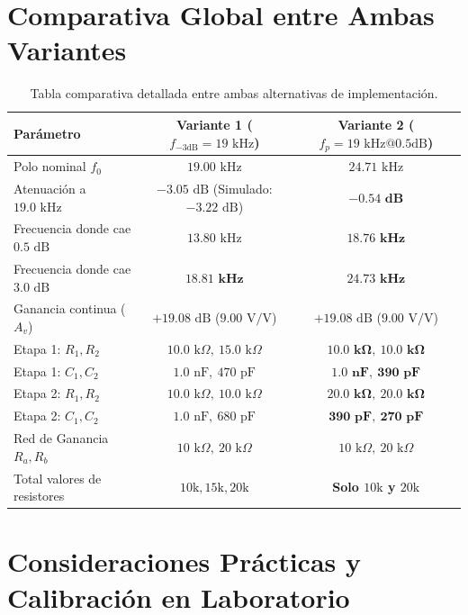 \documentclass[a4paper,11pt]{article}
\begin{document}
\section{Comparativa Global entre Ambas Variantes}

\begin{table}[H]
\centering
\small
\setlength{\tabcolsep}{5pt}
\begin{tabular}{lcc}
\toprule
\textbf{Parámetro} & \textbf{Variante 1 ($f_{-3\text{dB}} = 19\text{ kHz}$)} & \textbf{Variante 2 ($f_p = 19\text{ kHz} @ 0.5\text{dB}$)} \\
\midrule
Polo nominal $f_0$ & $19.00\text{ kHz}$ & $24.71\text{ kHz}$ \\
Atenuación a $19.0\text{ kHz}$ & $-3.05\text{ dB}$ (Simulado: $-3.22\text{ dB}$) & $\mathbf{-0.54\text{ dB}}$ \\
Frecuencia donde cae $0.5\text{ dB}$ & $13.80\text{ kHz}$ & $\mathbf{18.76\text{ kHz}}$ \\
Frecuencia donde cae $3.0\text{ dB}$ & $\mathbf{18.81\text{ kHz}}$ & $\mathbf{24.73\text{ kHz}}$ \\
Ganancia continua ($A_v$) & $+19.08\text{ dB}$ ($9.00\text{ V/V}$) & $+19.08\text{ dB}$ ($9.00\text{ V/V}$) \\
\midrule
Etapa 1: $R_1, R_2$ & $10.0\text{ k}\Omega,\ 15.0\text{ k}\Omega$ & $\mathbf{10.0\text{ k}\Omega,\ 10.0\text{ k}\Omega}$ \\
Etapa 1: $C_1, C_2$ & $1.0\text{ nF},\ 470\text{ pF}$ & $\mathbf{1.0\text{ nF},\ 390\text{ pF}}$ \\
Etapa 2: $R_1, R_2$ & $10.0\text{ k}\Omega,\ 10.0\text{ k}\Omega$ & $\mathbf{20.0\text{ k}\Omega,\ 20.0\text{ k}\Omega}$ \\
Etapa 2: $C_1, C_2$ & $1.0\text{ nF},\ 680\text{ pF}$ & $\mathbf{390\text{ pF},\ 270\text{ pF}}$ \\
Red de Ganancia $R_a, R_b$ & $10\text{ k}\Omega,\ 20\text{ k}\Omega$ & $10\text{ k}\Omega,\ 20\text{ k}\Omega$ \\
Total valores de resistores & $10\text{k}, 15\text{k}, 20\text{k}$ & \textbf{Solo $10\text{k}$ y $20\text{k}$} \\
\bottomrule
\end{tabular}
\caption{Tabla comparativa detallada entre ambas alternativas de implementación.}
\label{tab:comparativa}
\end{table}

\section{Consideraciones Prácticas y Calibración en Laboratorio}
\end{document}

